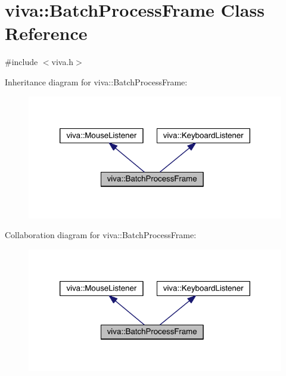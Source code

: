\hypertarget{classviva_1_1_batch_process_frame}{}\section{viva\+:\+:Batch\+Process\+Frame Class Reference}
\label{classviva_1_1_batch_process_frame}


{\ttfamily \#include $<$viva.\+h$>$}



Inheritance diagram for viva\+:\+:Batch\+Process\+Frame\+:
\nopagebreak
\begin{figure}[H]
\begin{center}
\leavevmode
\includegraphics[width=320pt]{classviva_1_1_batch_process_frame__inherit__graph}
\end{center}
\end{figure}


Collaboration diagram for viva\+:\+:Batch\+Process\+Frame\+:
\nopagebreak
\begin{figure}[H]
\begin{center}
\leavevmode
\includegraphics[width=320pt]{classviva_1_1_batch_process_frame__coll__graph}
\end{center}
\end{figure}
